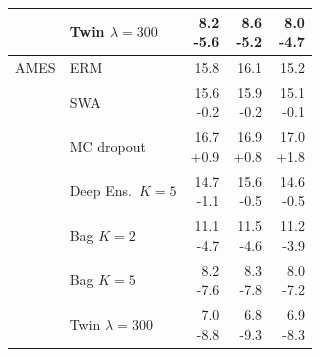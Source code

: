{\begin{longtable}{llrrr}
     & Twin $\lambda{=}300$ & \makecell[r]{8.2\\-5.6} & \makecell[r]{8.6\\-5.2} & \makecell[r]{8.0\\-4.7} \\
    \midrule
    AMES & ERM & \makecell[r]{15.8\\\strut} & \makecell[r]{16.1\\\strut} & \makecell[r]{15.2\\\strut} \\
     & SWA & \makecell[r]{15.6\\-0.2} & \makecell[r]{15.9\\-0.2} & \makecell[r]{15.1\\-0.1} \\
     & MC dropout & \makecell[r]{16.7\\+0.9} & \makecell[r]{16.9\\+0.8} & \makecell[r]{17.0\\+1.8} \\
     & Deep Ens.\ $K{=}5$ & \makecell[r]{14.7\\-1.1} & \makecell[r]{15.6\\-0.5} & \makecell[r]{14.6\\-0.5} \\
     & Bag $K{=}2$ & \makecell[r]{11.1\\-4.7} & \makecell[r]{11.5\\-4.6} & \makecell[r]{11.2\\-3.9} \\
     & Bag $K{=}5$ & \makecell[r]{8.2\\-7.6} & \makecell[r]{8.3\\-7.8} & \makecell[r]{8.0\\-7.2} \\
     & Twin $\lambda{=}300$ & \makecell[r]{7.0\\-8.8} & \makecell[r]{6.8\\-9.3} & \makecell[r]{6.9\\-8.3} \\
\end{longtable}
}
